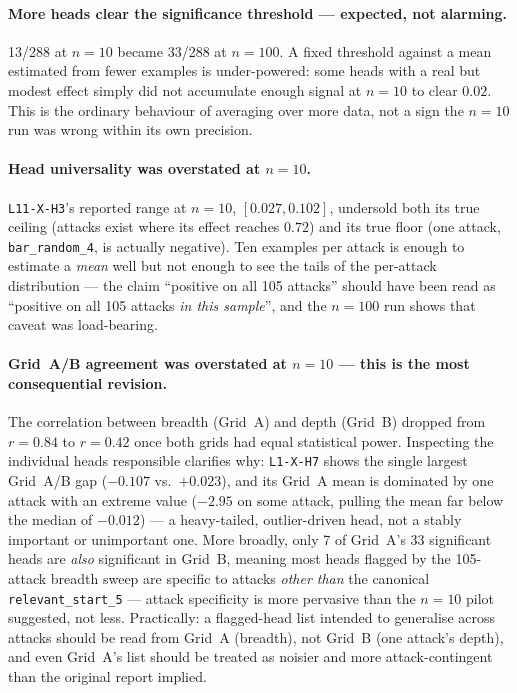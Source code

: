 \documentclass[11pt]{article}
\begin{document}
\paragraph{More heads clear the significance threshold — expected, not
alarming.} 13/288 at $n=10$ became 33/288 at $n=100$. A fixed threshold
against a mean estimated from fewer examples is under-powered: some heads
with a real but modest effect simply did not accumulate enough signal at
$n=10$ to clear $0.02$. This is the ordinary behaviour of averaging over
more data, not a sign the $n=10$ run was wrong within its own precision.

\paragraph{Head universality was overstated at $n=10$.}
\texttt{L11-X-H3}'s reported range at $n=10$, $[0.027, 0.102]$, undersold
both its true ceiling (attacks exist where its effect reaches $0.72$) and
its true floor (one attack, \texttt{bar\_random\_4}, is actually negative).
Ten examples per attack is enough to estimate a \emph{mean} well but not
enough to see the tails of the per-attack distribution — the claim
``positive on all 105 attacks'' should have been read as ``positive on all
105 attacks \emph{in this sample}'', and the $n=100$ run shows that caveat
was load-bearing.

\paragraph{Grid~A/B agreement was overstated at $n=10$ — this is the most
consequential revision.} The correlation between breadth (Grid~A) and depth
(Grid~B) dropped from $r=0.84$ to $r=0.42$ once both grids had equal
statistical power. Inspecting the individual heads responsible clarifies
why: \texttt{L1-X-H7} shows the single largest Grid~A/B gap
($-0.107$ vs.\ $+0.023$), and its Grid~A mean is dominated by one
attack with an extreme value ($-2.95$ on some attack, pulling the mean far
below the median of $-0.012$) — a heavy-tailed, outlier-driven head, not a
stably important or unimportant one. More broadly, only 7 of Grid~A's 33
significant heads are \emph{also} significant in Grid~B, meaning most
heads flagged by the 105-attack breadth sweep are specific to attacks
\emph{other than} the canonical \texttt{relevant\_start\_5} — attack
specificity is more pervasive than the $n=10$ pilot suggested, not less.
Practically: a flagged-head list intended to generalise across attacks
should be read from Grid~A (breadth), not Grid~B (one attack's depth), and
even Grid~A's list should be treated as noisier and more attack-contingent
than the original report implied.
\end{document}

